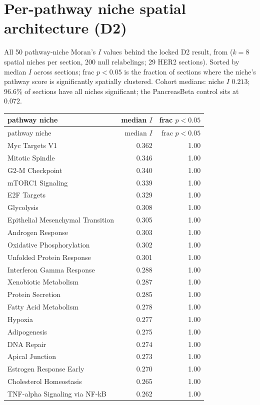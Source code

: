\section{Per-pathway niche spatial architecture (D2)}
{\sloppy All 50 pathway-niche Moran's $I$ values behind the locked D2 result, from  ($k=8$ spatial niches per section, 200 null relabelings; 29 HER2 sections). Sorted by median $I$ across sections; frac $p<0.05$ is the fraction of sections where the niche's pathway score is significantly spatially clustered. Cohort medians: niche $I$ $0.213$; 96.6\% of sections have all niches significant; the PancreasBeta control sits at $0.072$.\par}
\begin{longtable}{lrr}\hline\hline pathway niche & median $I$ & frac $p<0.05$\\\hline
\endfirsthead\hline\hline pathway niche & median $I$ & frac $p<0.05$\\\hline\endhead
Myc Targets V1 & 0.362 & 1.00\\
Mitotic Spindle & 0.346 & 1.00\\
G2-M Checkpoint & 0.340 & 1.00\\
mTORC1 Signaling & 0.339 & 1.00\\
E2F Targets & 0.329 & 1.00\\
Glycolysis & 0.308 & 1.00\\
Epithelial Mesenchymal Transition & 0.305 & 1.00\\
Androgen Response & 0.303 & 1.00\\
Oxidative Phosphorylation & 0.302 & 1.00\\
Unfolded Protein Response & 0.301 & 1.00\\
Interferon Gamma Response & 0.288 & 1.00\\
Xenobiotic Metabolism & 0.287 & 1.00\\
Protein Secretion & 0.285 & 1.00\\
Fatty Acid Metabolism & 0.278 & 1.00\\
Hypoxia & 0.277 & 1.00\\
Adipogenesis & 0.275 & 1.00\\
DNA Repair & 0.274 & 1.00\\
Apical Junction & 0.273 & 1.00\\
Estrogen Response Early & 0.270 & 1.00\\
Cholesterol Homeostasis & 0.265 & 1.00\\
TNF-alpha Signaling via NF-kB & 0.262 & 1.00\\

\end{longtable}
